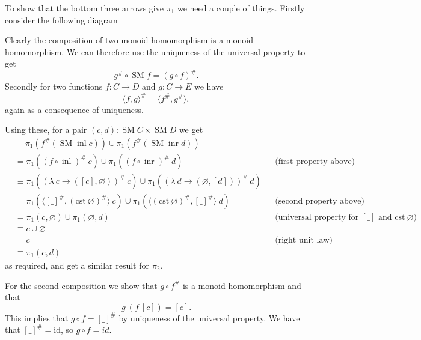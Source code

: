 \documentclass[12pt, parskip, DIV=14]{scrbook}
\renewcommand{\circ}{\vysmwhtcircle}
\newcommand{\SM}{\operatorname{SM}}
\newcommand{\inl}{\operatorname{inl}}
\newcommand{\inr}{\operatorname{inr}}
\begin{document}
To show that the bottom three arrows give $\pi_1$ we need a couple of things. Firstly consider the following diagram
\begin{center}
\end{center}
Clearly the composition of two monoid homomorphism is a monoid homomorphism. We can therefore use the uniqueness of the universal property to get
$$g^\# \circ \SM f = (g \circ f)^\#.$$ Secondly for two functions $f : C \to D$ and $g : C \to E$ we have
$$\langle f , g \rangle^\# = \langle f^\# , g^\# \rangle,$$
again as a consequence of uniqueness.

Using these, for a pair $(c , d) : \SM C \times \SM D$ we get
\begin{align*}
  &\quad\  \pi_1 (f^\# (\SM \inl c)) \cup \pi_1 (f^\# (\SM \inr d)) \\
  &= \pi_1 ((f \circ \inl)^\#~c) \cup \pi_1 ((f \circ \inr)^\#~d) &&\text{(first property above)} \\
  &\equiv \pi_1 ((\lambda~c \to ([c] , \varnothing))^\#~c) \cup \pi_1 ((\lambda~d \to (\varnothing , [d]))^\#~d) \\
  &= \pi_1 (\langle [\_]^\# , (\mathrm{cst}~\varnothing)^\# \rangle~c) \cup \pi_1 (\langle (\mathrm{cst}~\varnothing)^\# , [\_]^\# \rangle~d) &&\text{(second property above)}\\
  &= \pi_1 (c , \varnothing) \cup \pi_1 (\varnothing , d) &&\text{(universal property for $[\_]$ and $\mathrm{cst}~\varnothing$)}\\
  &\equiv c \cup \varnothing \\
  &= c &&\text{(right unit law)} \\
  &\equiv \pi_1 (c , d)
\end{align*}
as required, and get a similar result for $\pi_2$.

For the second composition we show that $g \circ f^\#$ is a monoid homomorphism and that
$$g~(f~[c]) = [c].$$
This implies that $g \circ f = [\_]^\#$ by uniqueness of the universal property.
We have that $[\_]^\# = \mathrm{id}$, so $g \circ f = id$.
\end{document}
